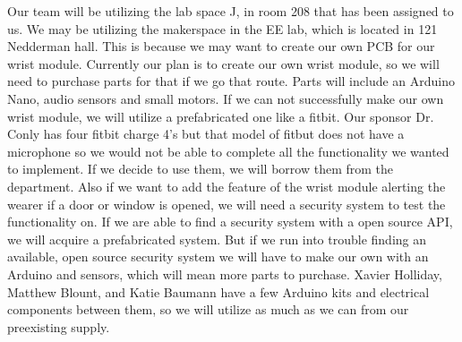 Our team will be utilizing the lab space J, in room 208 that has been assigned to us. We may be utilizing the makerspace in the EE lab, which is located in 121 Nedderman hall. This is because we may want to create our own PCB for our wrist module. Currently our plan is to create our own wrist module, so we will need to purchase parts for that if we go that route. Parts will include an Arduino Nano, audio sensors and small motors. If we can not successfully make our own wrist module, we will utilize a prefabricated one like a fitbit. Our sponsor Dr. Conly has four fitbit charge 4's but that model of fitbut does not have a microphone so we would not be able to complete all the functionality we wanted to implement. If we decide to use them, we will borrow them from the department. Also if we want to add the feature of the wrist module alerting the wearer if a door or window is opened, we will need a security system to test the functionality on. If we are able to find a security system with a open source API, we will acquire a prefabricated system. But if we run into trouble finding an available, open source security system we will have to make our own with an Arduino and sensors, which will mean more parts to purchase. Xavier Holliday, Matthew Blount, and Katie Baumann have a few Arduino kits and electrical components between them, so we will utilize as much as we can from our preexisting supply.
